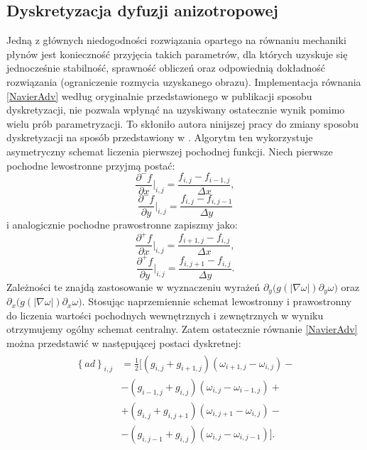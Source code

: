 \documentclass[12pt, twoside, openany]{report}
\theoremstyle{definition}
\begin{document}
\subsection{Dyskretyzacja dyfuzji anizotropowej}
\label{ssec:anisModNS}
Jedną z głównych niedogodności rozwiązania opartego na równaniu mechaniki płynów jest konieczność przyjęcia takich parametrów, dla których uzyskuje się jednocześnie stabilność, sprawność obliczeń oraz odpowiednią dokładność rozwiązania (ograniczenie rozmycia uzyskanego obrazu). Implementacja równania \eqref{NavierAdv} według oryginalnie przedstawionego w publikacji \cite{au2001image} sposobu dyskretyzacji, nie pozwala wpłynąć na uzyskiwany ostatecznie wynik pomimo wielu prób parametryzacji. To skłoniło autora ninijszej pracy do zmiany sposobu dyskretyzacji na sposób przedstawiony w \cite{van2005algorithms}. Algorytm ten wykorzystuje asymetryczny schemat liczenia pierwszej pochodnej funkcji. Niech pierwsze pochodne lewostronne przyjmą postać:
\begin{equation}
\frac{\partial^-f}{\partial x}\bigg|_{i,j}=\frac{f_{i,j}-f_{i-1,j}}{\Delta x}
\label{leftdfdx}
,
\end{equation}
\begin{equation}
{\frac{{\partial }^-f}{\partial y}}\bigg|_{i,j}=\frac{f_{i,j}-f_{i,j-1}}{\Delta y}
\label{leftdfdy}
\end{equation}
i analogicznie pochodne prawostronne zapiszmy jako:
\begin{equation}
{\frac{{\partial }^+f}{\partial x}}\bigg|_{i,j}=\frac{f_{i+1,j}-f_{i,j}}{\Delta x} 
\label{rightdfdx}
,
\end{equation}
\begin{equation}
{\frac{{\partial }^+f}{\partial y}}\bigg|_{i,j}=\frac{f_{i,j+1}-f_{i,j}}{\Delta y}
\label{rightdfdy}
.
\end{equation}
Zależności te znajdą zastosowanie w wyznaczeniu wyrażeń
${\partial }_y \Big(g\left(\left|\nabla \omega \right|\right){\partial }_y\omega \Big)$ oraz
${\partial }_x\Big(g\left(\left|\nabla \omega \right|\right){\partial }_x\omega \Big)$. Stosując naprzemiennie schemat lewostronny i prawostronny do liczenia wartości pochodnych wewnętrznych i zewnętrznych w wyniku otrzymujemy ogólny schemat centralny. Zatem ostatecznie równanie \eqref{NavierAdv} można przedstawić w następującej postaci dyskretnej:
\begin{align}
\begin{aligned}
{\left\{ad\right\}}_{i,j}
&= \frac{1}{2}\biggl[\left(g_{i,j}+g_{i+1,j}\right)\left({\omega }_{i+1,j}-{\omega }_{i,j}\right) -\\[1ex]
&- \left(g_{i-1,j}+g_{i,j}\right)\left({\omega }_{i,j}-{\omega }_{i-1,j}\right) +  \\[1ex]
&+ \left(g_{i,j}+g_{i,j+1}\right)\left({\omega }_{i,j+1}-{\omega }_{i,j}\right) -\\[1ex]
&- \left(g_{i,j-1}+g_{i,j}\right)\left({\omega }_{i,j}-{\omega }_{i,j-1}\right)\biggl].
\end{aligned}
\label{discreteAnisotropic2}
\end{align}
\end{document}
